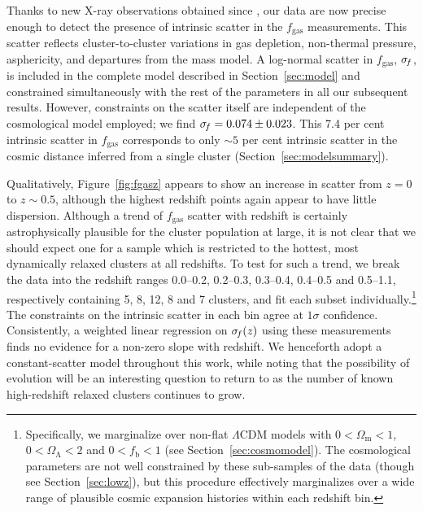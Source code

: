 \documentclass[useAMS,usenatbib,usegraphicx]{mn2e}
\newcommand*{\mysub}[2]{\ensuremath{#1_{\mathrm{#2}}}}
\newcommand*{\Omegam}{\mysub{\Omega}{m}}
\newcommand*{\Omegal}{\mysub{\Omega}{\Lambda}}
\newcommand*{\fbar}{\mysub{f}{b}}
\newcommand*{\fgas}{\mysub{f}{gas}}
\newcommand*{\sigmaf}{\ensuremath{\sigma_{\hspace{-0.25ex}f}}}
\newcommand*{\LCDM}{\ensuremath{\Lambda}CDM}
\newcommand*{\secref}{Section}
\newcommand*{\figref}{Figure}
\newcommand*{\arsemf}{\citetalias{Allen0706.0033}}
\newcommand*{\NFW}{\citetalias{Navarro9611107}}
\begin{document}
Thanks to new X-ray observations obtained since \arsemf{}, our data are now precise enough to detect the presence of intrinsic scatter in the \fgas{} measurements. This scatter reflects cluster-to-cluster variations in gas depletion, non-thermal pressure, asphericity, and departures from the \NFW{} mass model. A log-normal scatter in \fgas{}, $\sigmaf$,  is included in the complete model described in \secref~\ref{sec:model} and constrained simultaneously with the rest of the parameters in all our subsequent results. However, constraints on the scatter itself are independent of the cosmological model employed; we find $\sigmaf=0.074\pm0.023$. This 7.4 per cent intrinsic scatter in $\fgas$ corresponds to only $\sim5$ per cent intrinsic scatter in the cosmic distance inferred from a single cluster (\secref~\ref{sec:modelsummary}).

Qualitatively, \figref~\ref{fig:fgasz} appears to show an increase in scatter from $z=0$ to $z\sim0.5$, although the highest redshift points again appear to have little dispersion. Although a trend of \fgas{} scatter with redshift is certainly astrophysically plausible for the cluster population at large, it is not clear that we should expect one for a sample which is restricted to the hottest, most dynamically relaxed clusters at all redshifts. To test for such a trend, we break the data into the redshift ranges 0.0--0.2, 0.2--0.3, 0.3--0.4, 0.4--0.5 and 0.5--1.1, respectively containing 5, 8, 12, 8 and 7 clusters, and fit each subset individually.\footnote{Specifically, we marginalize over non-flat \LCDM{} models with $0<\Omegam<1$, $0<\Omegal<2$ and $0<\fbar<1$ (see \secref~\ref{sec:cosmomodel}). The cosmological parameters are not well constrained by these sub-samples of the data (though see \secref~\ref{sec:lowz}), but this procedure effectively marginalizes over a wide range of plausible cosmic expansion histories within each redshift bin.} The constraints on the intrinsic scatter in each bin agree at $1\sigma$ confidence. Consistently, a weighted linear regression on $\sigmaf(z)$ using these measurements finds no evidence for a non-zero slope with redshift. We henceforth adopt a constant-scatter model throughout this work, while noting that the possibility of evolution will be an interesting question to return to as the number of known high-redshift relaxed clusters continues to grow. 
\end{document}
